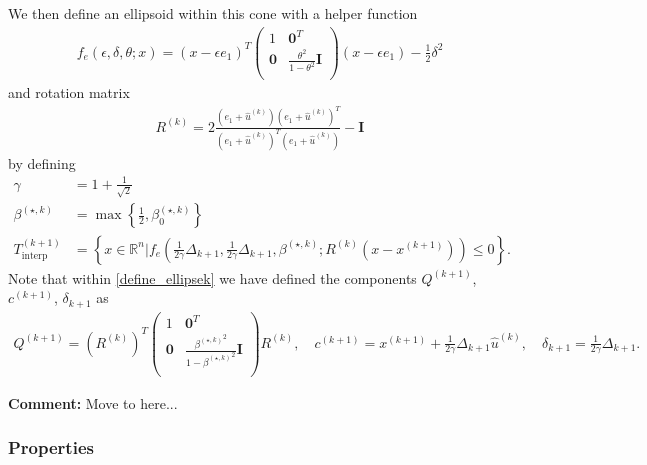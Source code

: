 \documentclass{article}
\newenvironment{comment}
  {\par\medskip
   \color{red}%
   \begin{framed}
   \textbf{Comment: }\ignorespaces}
 {\end{framed}
  \medskip}
\theoremstyle{case}
\numberwithin{theorem}{subsection}
\newcommand{\bs}{{\beta^{(\star, k)}}}
\newcommand{\bsk}{{\beta_0^{(\star, k)}}}
\newcommand{\dkpo}{\Delta_{k+1}}
\newcommand{\huk}{{{\hat u}^{(k)}}}
\newcommand{\Rn}{\mathbb R^n}
\newcommand{\rotk}{{R^{(k)}}}
\newcommand{\sampletrkpo}{{T_{\text{interp}}^{(k+1)}}}
\newcommand{\xkpo}{{{x}^{(k+1)}}}
\newcommand{\qkpo}{{Q^{(k+1)}}}
\newcommand{\ckpo}{{c^{(k+1)}}}
\newcommand{\sdkpo}{{\delta_{k+1}}}
\begin{document}
We then define an ellipsoid within this cone with a helper function
\begin{align}
f_e(\epsilon, \delta, \theta; x) = (x - \epsilon e_1)^T\begin{pmatrix}
1 & \boldsymbol0^T \\
\boldsymbol 0 & \frac{\theta^2}{1 - \theta^2} \boldsymbol I \\
\end{pmatrix}(x - \epsilon e_1) - \frac 1 2 \delta^2 \label{define_ellipse_function}
\end{align}
and rotation matrix
\begin{align}
\rotk = 2\frac{(e_1 + \huk)(e_1 + \huk)^T}{(e_1 + \huk)^T(e_1 + \huk)} - \boldsymbol I \label{define_rotation}
\end{align}
by defining
\begin{align}
\gamma &= 1 + \frac 1 {\sqrt{2}} \label{define_the_constant_gamma} \\
\bs &= \max\left\{\frac 1 2 , \bsk\right\} \label{define_bs} \\
\sampletrkpo &= \left\{x \in \Rn | f_e\left(\frac 1 {2\gamma} \dkpo, \frac 1 {2\gamma} \dkpo,\bs; \rotk(x - \xkpo)\right) \le 0\right\}. \label{define_ellipsek}
\end{align}
Note that within \cref{define_ellipsek} we have defined the components $\qkpo$, $\ckpo$, $\sdkpo$ as
\begin{align}
\qkpo = \left(\rotk\right)^T \begin{pmatrix}
1 & \boldsymbol0^T \\
\boldsymbol 0 & \frac{\bs^2}{1 - \bs^2} \boldsymbol I \\
\end{pmatrix} \rotk, \quad
\ckpo = \xkpo + \frac 1 {2\gamma} \dkpo \huk, \quad
\sdkpo = \frac 1 {2\gamma} \dkpo. \label{conservative_ellipsoid_details}
\end{align}


\begin{comment}
Move to here...
\end{comment}

\subsubsection{Properties}
\label{feasible_ellipsoid_analysis}
\end{document}
